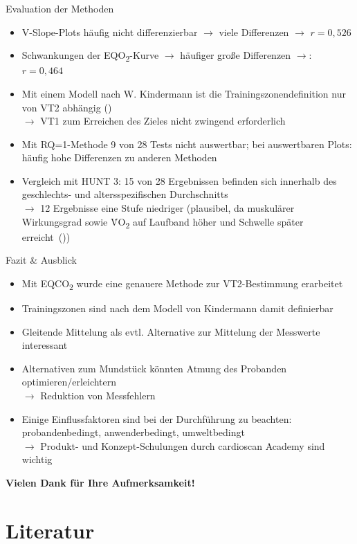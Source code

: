 \documentclass[colorBG,slideColor,8pt]{beamer}
\newcommand{\eqotwo}{EQO\textsubscript{2}}
\newcommand{\eqcotwo}{EQCO\textsubscript{2}}
\newcommand{\votwo}{\.{V}O\textsubscript{2}}
\begin{document}
\begin{frame}{Evaluation der Methoden}
\begin{itemize}
	\item V-Slope-Plots häufig nicht differenzierbar $\rightarrow$ viele Differenzen $\rightarrow$ $r = 0,526$
	\item Schwankungen der \eqotwo-Kurve $\rightarrow$ häufiger große Differenzen $\rightarrow$: $r = 0,464$
	\item Mit einem Modell nach W. Kindermann ist die Trainingszonendefinition nur von VT2 abhängig (\cite{Kindermann.2004})\\$\rightarrow$ VT1 zum Erreichen des Zieles nicht zwingend erforderlich
	\item Mit RQ=1-Methode 9 von 28 Tests nicht auswertbar; bei auswertbaren Plots: häufig hohe Differenzen zu anderen Methoden
	\item Vergleich mit HUNT 3: 15 von 28 Ergebnissen befinden sich innerhalb des geschlechts- und altersspezifischen Durchschnitts\\$\rightarrow$ 12 Ergebnisse eine Stufe niedriger (plausibel, da muskulärer Wirkungsgrad sowie \votwo{} auf Laufband höher und Schwelle später erreicht~(\cite{Kroidl.2015}))
\end{itemize}
\end{frame}

\begin{frame}{Fazit \& Ausblick}
\begin{itemize}
	\item Mit \eqcotwo{} wurde eine genauere Methode zur VT2-Bestimmung erarbeitet
	\item Trainingszonen sind nach dem Modell von Kindermann damit definierbar
	\item Gleitende Mittelung als evtl. Alternative zur Mittelung der Messwerte interessant
	\item Alternativen zum Mundstück könnten Atmung des Probanden optimieren/erleichtern\\$\rightarrow$ Reduktion von Messfehlern
	\item Einige Einflussfaktoren sind bei der Durchführung zu beachten: probandenbedingt, anwenderbedingt, umweltbedingt\\$\rightarrow$ Produkt- und Konzept-Schulungen durch cardioscan Academy sind wichtig
\end{itemize}
\end{frame}

\begin{frame}
\begin{center}
	\large{\textbf{Vielen Dank für Ihre Aufmerksamkeit!}}
\end{center}
\end{frame}

\section{Literatur}

\begin{frame}
\begin{columns}
\begin{column}{0.9\linewidth}
\nocite{*}
\printbibliography
\end{column}
\end{columns}
\end{frame}
\end{document}
